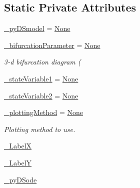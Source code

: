 \subsection*{Static Private Attributes}
\begin{DoxyCompactItemize}
\item 
\hyperlink{class_mu_mo_t_1_1_mu_mo_t_1_1_mu_mo_tbifurcation_view_a9e9a430da6d323cc4411c070e0c7eee5}{\+\_\+py\+D\+Smodel} = \hyperlink{class_mu_mo_t_1_1_mu_mo_t_1_1_mu_mo_tbifurcation_view_ac7485dcc8d256a6f197ed7802687f252}{None}
\item 
\hyperlink{class_mu_mo_t_1_1_mu_mo_t_1_1_mu_mo_tbifurcation_view_a17d5bd0e623faea6f50fc3b7f01d0d38}{\+\_\+bifurcation\+Parameter} = \hyperlink{class_mu_mo_t_1_1_mu_mo_t_1_1_mu_mo_tbifurcation_view_ac7485dcc8d256a6f197ed7802687f252}{None}
\begin{DoxyCompactList}\small\item\em 3-\/d bifurcation diagram ( \end{DoxyCompactList}\item 
\hyperlink{class_mu_mo_t_1_1_mu_mo_t_1_1_mu_mo_tbifurcation_view_aa14fa36730691becc6f3136899545416}{\+\_\+state\+Variable1} = \hyperlink{class_mu_mo_t_1_1_mu_mo_t_1_1_mu_mo_tbifurcation_view_ac7485dcc8d256a6f197ed7802687f252}{None}
\item 
\hyperlink{class_mu_mo_t_1_1_mu_mo_t_1_1_mu_mo_tbifurcation_view_a9d3705d1d9182e10751ff693573d6d16}{\+\_\+state\+Variable2} = \hyperlink{class_mu_mo_t_1_1_mu_mo_t_1_1_mu_mo_tbifurcation_view_ac7485dcc8d256a6f197ed7802687f252}{None}
\item 
\hyperlink{class_mu_mo_t_1_1_mu_mo_t_1_1_mu_mo_tbifurcation_view_a72e3294250042322910555edb2ef8f9d}{\+\_\+plotting\+Method} = \hyperlink{class_mu_mo_t_1_1_mu_mo_t_1_1_mu_mo_tbifurcation_view_ac7485dcc8d256a6f197ed7802687f252}{None}
\begin{DoxyCompactList}\small\item\em Plotting method to use. \end{DoxyCompactList}\item 
\hyperlink{class_mu_mo_t_1_1_mu_mo_t_1_1_mu_mo_tbifurcation_view_a1ae22852e6ebc2a6b1cdfee3383063e9}{\+\_\+\+LabelX}
\item 
\hyperlink{class_mu_mo_t_1_1_mu_mo_t_1_1_mu_mo_tbifurcation_view_ae2c6b16828eec194022056d04af84f16}{\+\_\+\+LabelY}
\item 
\hyperlink{class_mu_mo_t_1_1_mu_mo_t_1_1_mu_mo_tbifurcation_view_a45f0a60363e440604d8e5b08930eb7b5}{\+\_\+py\+D\+Sode}
\item 

\end{DoxyCompactItemize}

